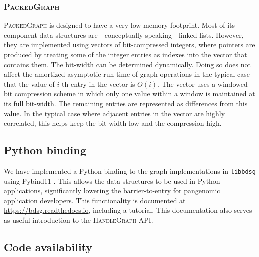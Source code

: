 \documentclass{article}
\begin{document}
\subsubsection{\textsc{PackedGraph}}

\textsc{PackedGraph} is designed to have a very low memory footprint.
Most of its component data structures are---conceptually speaking---linked lists.
However, they are implemented using vectors of bit-compressed integers, where pointers are produced by treating some of the integer entries as indexes into the vector that contains them.
The bit-width can be determined dynamically.
Doing so does not affect the amortized asymptotic run time of graph operations in the typical case that the value of $i$-th entry in the vector is $O(i)$.
The vector uses a windowed bit compression scheme in which only one value within a window is maintained at its full bit-width.
The remaining entries are represented as differences from this value.
In the typical case where adjacent entries in the vector are highly correlated, this helps keep the bit-width low and the compression high.


\subsection{Python binding}

We have implemented a Python binding to the graph implementations in \texttt{libbdsg} using Pybind11 \cite{pybind11}.
This allows the data structures to be used in Python applications, significantly lowering the barrier-to-entry for pangenomic application developers.
This functionality is documented at \url{https://bdsg.readthedocs.io}, including a tutorial.
This documentation also serves as useful introduction to the \textsc{HandleGraph} API.

\subsection{Code availability}
\end{document}
